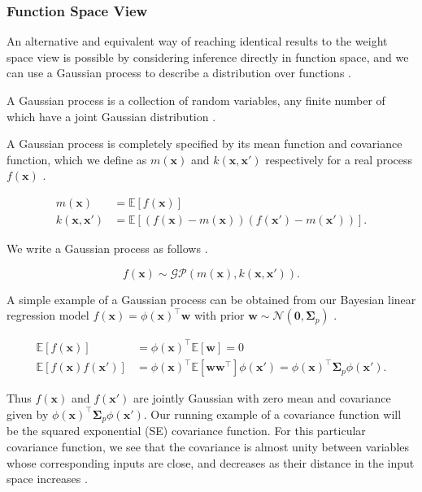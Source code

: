 \documentclass[../../../main.tex]{subfiles}
\begin{document}
\subsubsection{Function Space View}

An alternative and equivalent way of reaching identical results to the weight space view is possible by considering inference directly in function space, and we can use a Gaussian process to describe a distribution over functions \autocite{Rasmussen2005}.

\begin{definition}
A Gaussian process is a collection of random variables, any finite number of which have a joint Gaussian distribution \autocite{Rasmussen2005}.
\end{definition}

A Gaussian process is completely specified by its mean function and covariance function, which we define as $m(\bm{x})$ and $k(\bm{x},\bm{x}')$ respectively for a real process $f(\bm{x})$ \autocite{Rasmussen2005}.

\begin{equation}
\begin{split}
m(\bm{x}) &= \mathbb{E}[f(\bm{x})] \\
k(\bm{x},\bm{x}') &= \mathbb{E}[(f(\bm{x})-m(\bm{x}))(f(\bm{x}')-m(\bm{x}'))].
\end{split}
\end{equation}

We write a Gaussian process as follows \autocite{Rasmussen2005}.

\begin{equation}
f(\bm{x}) \sim \mathcal{GP}(m(\bm{x}),k(\bm{x},\bm{x}')).
\end{equation}

A simple example of a Gaussian process can be obtained from our Bayesian linear regression model $f(\bm{x})=\phi(\bm{x})^\top\bm{w}$ with prior $\bm{w}\sim\mathcal{N}(\bm{0},\bm{\Sigma}_p)$ \autocite{Rasmussen2005}.

\begin{equation}
\begin{split}
\mathbb{E}[f(\bm{x})] &= \phi(\bm{x})^\top\mathbb{E}[\bm{w}] = 0 \\
\mathbb{E}[f(\bm{x})f(\bm{x}')] &= \phi(\bm{x})^\top\mathbb{E}[\bm{w}\bm{w}^\top]\phi(\bm{x}') = \phi(\bm{x})^\top\bm{\Sigma}_p\phi(\bm{x}').
\end{split}
\end{equation}

Thus $f(\bm{x})$ and $f(\bm{x}')$ are jointly Gaussian with zero mean and covariance given by $\phi(\bm{x})^\top\bm{\Sigma}_p\phi(\bm{x}')$. Our running example of a covariance function will be the squared exponential (SE) covariance function. For this particular covariance function, we see that the covariance is almost unity between variables whose corresponding inputs are close, and decreases as their distance in the input space increases \autocite{Rasmussen2005}.
\end{document}
